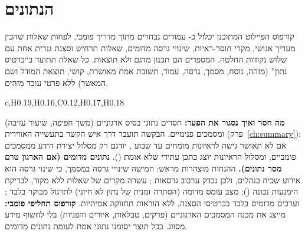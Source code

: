 \section{הנתונים}\label{sec:soldata}
קורפוס הפיילוט המתוכנן יכלול כ- עמודים נבחרים מתוך מדריך פומבי, לפחות  שאלות שהכין מעריך אנושי,  מקרי חוסר-ראיות,
 שינויי גרסה מדומים,  שאלות תרחיש וסצנת  גנרית אחת עם שלוש נקודות החלטה. המספרים הם תכנון מדגם ולא תוצאות. כל שאלה תתועד ב“כרטיס נתון” (מזהה, נוסח, מסמך, גרסה, עמוד, תשובת אמת מאושרת, קושי, תוצאת המודל ושם המאשר) ללא פרטי עובד מזהים.
\begin{table}[!htbp]
\centering
\pcCompactTables
\caption{מלאי הנתונים: מה יש, מאיפה ומה חסר}\label{tab:data}
\begin{pctable}{c,H{0.19},H{0.16},C{0.12},H{0.17},H{0.18}}
\end{pctable}
\end{table}
\textbf{מה חסר ואיך נסגור את הפער:} חסרים נתוני בסיס ארגוניים (משך חפיפה, שיעור עזיבה) ומסמכים פנימיים. הבקשה תועבר דרך איש הקשר בתעשייה האווירית (פרק~\ref{ch:summary});
אם לא תאושר גישה לראיונות מומחים עד שבוע , יודגם רק מסלול יצירת הידע ממסמכים פומביים, ומסלול הראיונות יוצג כתכן עתידי שלא אומת ().
\textbf{נתונים מדומים (אם הארגון טרם מסר נתונים).} ההנחות מוצהרות מראש: חמישה שינויי גרסה במסמך, כי שינוי גרסה הוא אירוע שכיח בנהלים, ולכן נבדק ערבוב גרסאות
\cite{zheng2025knowshift}; עשרה מקרים של שאלות ללא מקור, לבדיקת הימנעות נכונה (); מצב עומס מדומה (הסתרה זמנית של נתון לא חיוני) לתרגול מבוקר בלבד \cite{nist80084};
וערכים מדומים בלבד בכרטיסי הסצנה, ללא הוראות תחזוקה אמיתיות.
\textbf{קורפוס תחליפי פומבי:}  \cite{faa2023amt} מייצג את מבנה המסמכים הארגוניים (פרקים, טבלאות, איורים והפניות) בלי לחשוף מידע מסווג. בכל תוצר יסומנו נתוני
אמת לעומת נתונים מדומים.

